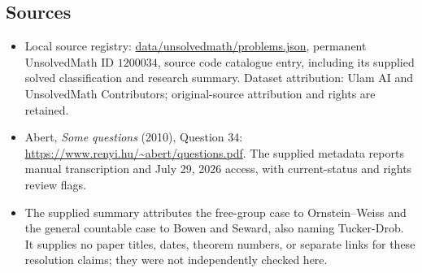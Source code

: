 \documentclass[11pt]{article}
\begin{document}
\subsection{Sources}
\begin{itemize}
\item Local source registry: \url{data/unsolvedmath/problems.json}, permanent UnsolvedMath ID $1200034$, source code catalogue entry, including its supplied solved classification and research summary. Dataset attribution: Ulam AI and UnsolvedMath Contributors; original-source attribution and rights are retained.
\item Abert, \emph{Some questions} (2010), Question 34: \url{https://www.renyi.hu/~abert/questions.pdf}. The supplied metadata reports manual transcription and July 29, 2026 access, with current-status and rights review flags.
\item The supplied summary attributes the free-group case to Ornstein--Weiss and the general countable case to Bowen and Seward, also naming Tucker-Drob. It supplies no paper titles, dates, theorem numbers, or separate links for these resolution claims; they were not independently checked here.
\end{itemize}
\end{document}

